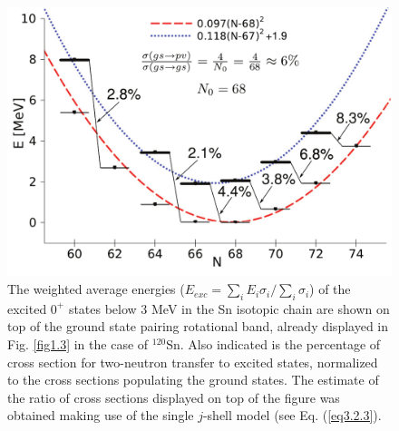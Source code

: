   \begin{figure}
  \centerline{\includegraphics*[width=\textwidth,angle=0]{nutshell/figs/fig2_1_4.pdf}}
  \caption{The weighted average energies ($E_{exc}=\sum_i E_i \sigma_i/\sum_i \sigma_i$) of the excited $0^+$ states below 3 MeV in the Sn isotopic chain are shown on top of the ground state pairing rotational band, already displayed in Fig. \ref{fig1.3} in the case of $^{120}$Sn. Also indicated is the percentage of cross section for two-neutron transfer to excited states, normalized to the cross sections populating the ground states. The estimate of the ratio of cross sections displayed on top of the figure was obtained making use of the single $j$-shell model (see Eq. (\ref{eq3.2.3}).}\label{fig1.4}
  \end{figure}
